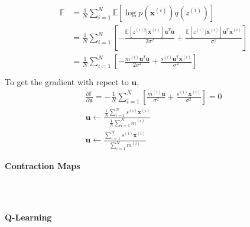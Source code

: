 \documentclass{myhw}
\begin{document}
\begin{homeworkProblem}
\begin{homeworkSection}
\begin{gather*}
\begin{aligned}
\mathbb{F} &= \frac{1}{N} \sum_{i=1}^N \mathbb{E}
[\log p(\bm{x}^{(i)})q(z^{(i)})] \\
&= \frac{1}{N} \sum_{i=1}^N [-\frac{\mathbb{E} [z^{(i)2}|\bm{x}^{(i)}] \bm{u}^T\bm{u}}{2\sigma^2} 
+ \frac{\mathbb{E} [z^{(i)}|\bm{x}^{(i)}] \bm{u}^T \bm{x}^{(i)} }{\sigma^2}] \\
&= \frac{1}{N} \sum_{i=1}^N [-\frac{ m^{(i)} \bm{u}^T\bm{u}}{2\sigma^2} 
+ \frac{ s^{(i)} \bm{u}^T\bm{x}^{(i)}}{\sigma^2}] \\
\end{aligned}
\end{gather*}
To get the gradient with repect to $\bm{u}$,
\begin{gather*}
\frac{\partial \mathbb{F}}{\partial \bm{u}} = 
-\frac{1}{N} \sum_{i=1}^N [\frac{m^{(i)} \bm{u}}{\sigma^2} + \frac{s^{(i)} \bm{x}^{(i)}}{\sigma^2}] = 0 \\
\bm{u} \leftarrow \frac{\frac{1}{N} \sum_{i=1}^N s^{(i)} \bm{x}^{(i)}}{\frac{1}{N} \sum_{i=1}^N m^{(i)}} \\
\bm{u} \leftarrow \frac{\sum_{i=1}^N s^{(i)} \bm{x}^{(i)}}{\sum_{i=1}^N m^{(i)}}
\end{gather*}
\end{homeworkSection}
\end{homeworkProblem}


\begin{homeworkProblem}
\textbf{Contraction Maps}
\begin{homeworkSection}
\emph{} \\
\\
\end{homeworkSection}
\end{homeworkProblem}


\begin{homeworkProblem}
\textbf{Q-Learning}
\begin{homeworkSection}	
\emph{} \\
\\
\end{homeworkSection}
\begin{homeworkSection}	
\emph{} \\
\\
\end{homeworkSection}
\end{homeworkProblem}
\end{document}

